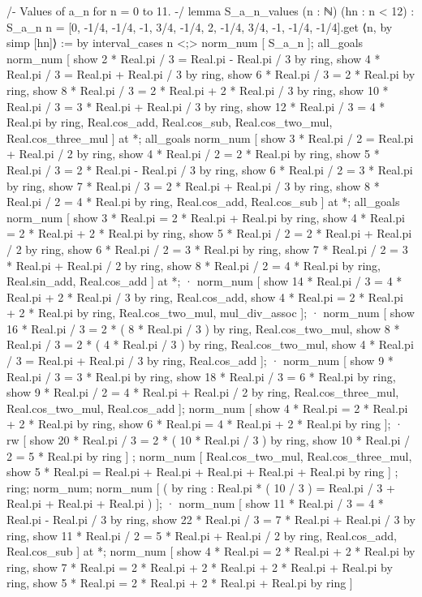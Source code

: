 /-
Values of a_n for n = 0 to 11.
-/
lemma S_a_n_values (n : ℕ) (hn : n < 12) :
  S_a_n n = [0, -1/4, -1/4, -1, 3/4, -1/4, 2, -1/4, 3/4, -1, -1/4, -1/4].get ⟨n, by simp [hn]⟩ := by
    interval_cases n <;> norm_num [ S_a_n ];
    all_goals norm_num [ show 2 * Real.pi / 3 = Real.pi - Real.pi / 3 by ring, show 4 * Real.pi / 3 = Real.pi + Real.pi / 3 by ring, show 6 * Real.pi / 3 = 2 * Real.pi by ring, show 8 * Real.pi / 3 = 2 * Real.pi + 2 * Real.pi / 3 by ring, show 10 * Real.pi / 3 = 3 * Real.pi + Real.pi / 3 by ring, show 12 * Real.pi / 3 = 4 * Real.pi by ring, Real.cos_add, Real.cos_sub, Real.cos_two_mul, Real.cos_three_mul ] at *;
    all_goals norm_num [ show 3 * Real.pi / 2 = Real.pi + Real.pi / 2 by ring, show 4 * Real.pi / 2 = 2 * Real.pi by ring, show 5 * Real.pi / 3 = 2 * Real.pi - Real.pi / 3 by ring, show 6 * Real.pi / 2 = 3 * Real.pi by ring, show 7 * Real.pi / 3 = 2 * Real.pi + Real.pi / 3 by ring, show 8 * Real.pi / 2 = 4 * Real.pi by ring, Real.cos_add, Real.cos_sub ] at *;
    all_goals norm_num [ show 3 * Real.pi = 2 * Real.pi + Real.pi by ring, show 4 * Real.pi = 2 * Real.pi + 2 * Real.pi by ring, show 5 * Real.pi / 2 = 2 * Real.pi + Real.pi / 2 by ring, show 6 * Real.pi / 2 = 3 * Real.pi by ring, show 7 * Real.pi / 2 = 3 * Real.pi + Real.pi / 2 by ring, show 8 * Real.pi / 2 = 4 * Real.pi by ring, Real.sin_add, Real.cos_add ] at *;
    · norm_num [ show 14 * Real.pi / 3 = 4 * Real.pi + 2 * Real.pi / 3 by ring, Real.cos_add, show 4 * Real.pi = 2 * Real.pi + 2 * Real.pi by ring, Real.cos_two_mul, mul_div_assoc ];
    · norm_num [ show 16 * Real.pi / 3 = 2 * ( 8 * Real.pi / 3 ) by ring, Real.cos_two_mul, show 8 * Real.pi / 3 = 2 * ( 4 * Real.pi / 3 ) by ring, Real.cos_two_mul, show 4 * Real.pi / 3 = Real.pi + Real.pi / 3 by ring, Real.cos_add ];
    · norm_num [ show 9 * Real.pi / 3 = 3 * Real.pi by ring, show 18 * Real.pi / 3 = 6 * Real.pi by ring, show 9 * Real.pi / 2 = 4 * Real.pi + Real.pi / 2 by ring, Real.cos_three_mul, Real.cos_two_mul, Real.cos_add ];
      norm_num [ show 4 * Real.pi = 2 * Real.pi + 2 * Real.pi by ring, show 6 * Real.pi = 4 * Real.pi + 2 * Real.pi by ring ];
    · rw [ show 20 * Real.pi / 3 = 2 * ( 10 * Real.pi / 3 ) by ring, show 10 * Real.pi / 2 = 5 * Real.pi by ring ] ; norm_num [ Real.cos_two_mul, Real.cos_three_mul, show 5 * Real.pi = Real.pi + Real.pi + Real.pi + Real.pi + Real.pi by ring ] ; ring; norm_num;
      norm_num [ ( by ring : Real.pi * ( 10 / 3 ) = Real.pi / 3 + Real.pi + Real.pi + Real.pi ) ];
    · norm_num [ show 11 * Real.pi / 3 = 4 * Real.pi - Real.pi / 3 by ring, show 22 * Real.pi / 3 = 7 * Real.pi + Real.pi / 3 by ring, show 11 * Real.pi / 2 = 5 * Real.pi + Real.pi / 2 by ring, Real.cos_add, Real.cos_sub ] at *;
      norm_num [ show 4 * Real.pi = 2 * Real.pi + 2 * Real.pi by ring, show 7 * Real.pi = 2 * Real.pi + 2 * Real.pi + 2 * Real.pi + Real.pi by ring, show 5 * Real.pi = 2 * Real.pi + 2 * Real.pi + Real.pi by ring ]

